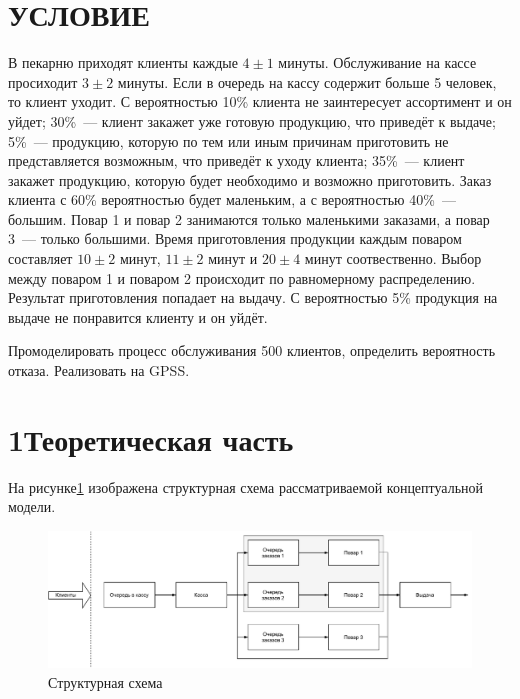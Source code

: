 \section*{\hfill{}УСЛОВИЕ\hfill{}}
В пекарню приходят клиенты каждые $4\pm1$ минуты. Обслуживание на кассе просиходит $3\pm2$ минуты. Если в очередь на кассу содержит больше 5 человек, то клиент уходит. С вероятностью 10\% клиента не заинтересует ассортимент и он уйдет; 30\%~--- клиент закажет уже готовую продукцию, что приведёт к выдаче; 5\%~--- продукцию, которую по тем или иным причинам приготовить не представляется возможным, что приведёт к уходу клиента; 35\%~--- клиент закажет продукцию, которую будет необходимо и возможно приготовить. Заказ клиента с 60\% вероятностью будет маленьким, а с вероятностью 40\%~--- большим. Повар 1 и повар 2 занимаются только маленькими заказами, а повар 3~--- только большими. Время приготовления продукции каждым поваром составляет $10\pm2$ минут, $11\pm2$ минут и $20\pm4$ минут соотвественно. Выбор между поваром 1 и поваром 2 происходит по равномерному распределению. Результат приготовления попадает на выдачу. С вероятностью 5\% продукция на выдаче не понравится клиенту и он уйдёт.

Промоделировать процесс обслуживания 500 клиентов, определить вероятность отказа. Реализовать на GPSS.

\section*{\hspace{1.25cm}1\quad{}Теоретическая часть}
На рисунке\ref{img:concept} изображена структурная схема рассматриваемой концептуальной модели.
\begin{figure}[H]
    \centering
    \includegraphics[width=1\textwidth]{pdf/concept.pdf}
    \caption{Структурная схема}
    \label{img:concept}
\end{figure}

